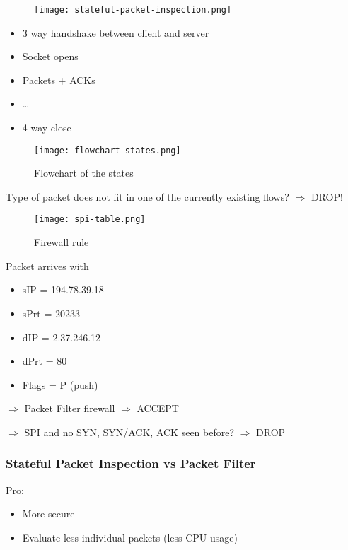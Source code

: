 \documentclass{article}
\begin{document}
\begin{figure}[H]
    \centering
    \texttt{[image: stateful-packet-inspection.png]}
    \caption{}
\end{figure}

\begin{itemize}
    \item 3 way handshake between client and server
    \item Socket opens
    \item Packets + ACKs
    \item \dots
    \item 4 way close
\end{itemize}

\begin{figure}[H]
    \centering
    \texttt{[image: flowchart-states.png]}
    \caption{Flowchart of the states}
\end{figure}


Type of packet does not fit in one of the currently existing flows? $\Rightarrow$ DROP!

\begin{figure}[H]
    \centering
    \texttt{[image: spi-table.png]}
    \caption{Firewall rule}
\end{figure}

Packet arrives with

\begin{itemize}
    \item sIP = 194.78.39.18
    \item sPrt = 20233
    \item dIP = 2.37.246.12
    \item dPrt = 80
    \item Flags = P (push)
\end{itemize}


$\Rightarrow$ Packet Filter firewall $\Rightarrow$ ACCEPT

$\Rightarrow$ SPI and no SYN, SYN/ACK, ACK seen before? $\Rightarrow$ DROP


\subsubsection{Stateful Packet Inspection vs Packet Filter}

Pro:

\begin{itemize}
    \item More secure
    \item Evaluate less individual packets (less CPU usage)
\end{itemize}
\end{document}
